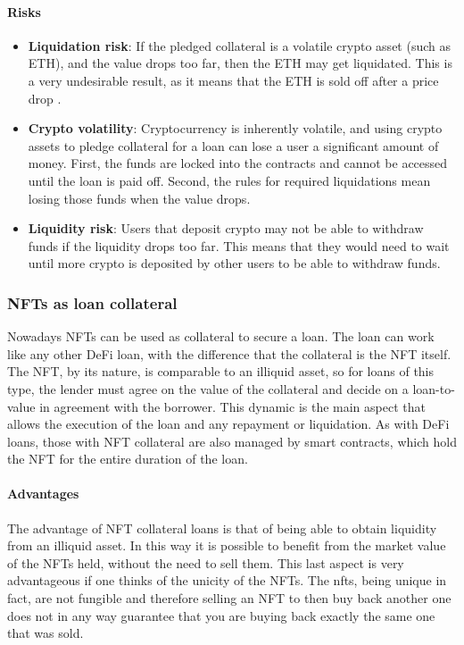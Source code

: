 \paragraph{Risks} \cite{doerr2021defi}
\begin{itemize}
    \item \textbf{Liquidation risk}: If the pledged collateral is a volatile crypto asset (such as ETH), and the value drops too far, then the ETH may get liquidated. This is a very undesirable result, as it means that the ETH is sold off after a price drop \cite{qin2021empirical}.
    \item \textbf{Crypto volatility}: Cryptocurrency is inherently volatile, and using crypto assets to pledge collateral for a loan can lose a user a significant amount of money. First, the funds are locked into the contracts and cannot be accessed until the loan is paid off. Second, the rules for required liquidations mean losing those funds when the value drops. 
    \item \textbf{Liquidity risk}: Users that deposit crypto may not be able to withdraw funds if the liquidity drops too far. This means that they would need to wait until more crypto is deposited by other users to be able to withdraw funds.
\end{itemize}

\subsubsection{NFTs as loan collateral}
Nowadays NFTs can be used as collateral to secure a loan. The loan can work like any other DeFi loan, with the difference that the collateral is the NFT itself. The NFT, by its nature, is comparable to an illiquid asset, so for loans of this type, the lender must agree on the value of the collateral and decide on a loan-to-value in agreement with the borrower. This dynamic is the main aspect that allows the execution of the loan and any repayment or liquidation. As with DeFi loans, those with NFT collateral are also managed by smart contracts, which hold the NFT for the entire duration of the loan.

\paragraph{Advantages} 
The advantage of NFT collateral loans is that of being able to obtain liquidity from an illiquid asset. In this way it is possible to benefit from the market value of the NFTs held, without the need to sell them. This last aspect is very advantageous if one thinks of the unicity of the NFTs. The nfts, being unique in fact, are not fungible and therefore selling an NFT to then buy back another one does not in any way guarantee that you are buying back exactly the same one that was sold. 

